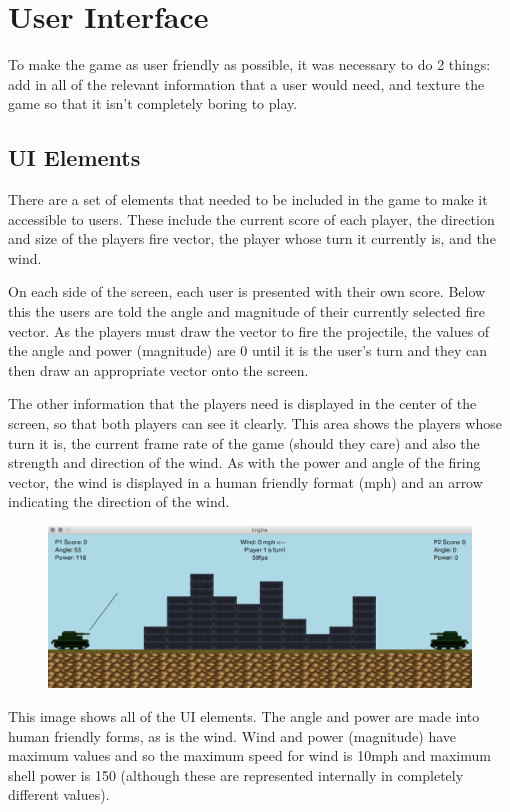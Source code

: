 \documentclass[12pt]{article}
\begin{document}
\section{User Interface}
To make the game as user friendly as possible, it was necessary to do 2 things: add in all of the relevant information that a user would need, and texture the game so that it isn't completely boring to play.
\subsection{UI Elements}
There are a set of elements that needed to be included in the game to make it accessible to users. These include the current score of each player, the direction and size of the players fire vector, the player whose turn it currently is, and the wind.
\par 
On each side of the screen, each user is presented with their own score. Below this the users are told the angle and magnitude of their currently selected fire vector. As the players must draw the vector to fire the projectile, the values of the angle and power (magnitude) are 0 until it is the user's turn and they can then draw an appropriate vector onto the screen. 
\par 
The other information that the players need is displayed in the center of the screen, so that both players can see it clearly. This area shows the players whose turn it is, the current frame rate of the game (should they care) and also the strength and direction of the wind. As with the power and angle of the firing vector, the wind is displayed in a human friendly format (mph) and an arrow indicating the direction of the wind.
\begin{figure}[H]
\centerline{\includegraphics[width=17cm]{vector}}
\end{figure}
This image shows all of the UI elements. The angle and power are made into human friendly forms, as is the wind. Wind and power (magnitude) have maximum values and so the maximum speed for wind is 10mph and maximum shell power is 150 (although these are represented internally in completely different values).
\end{document}
